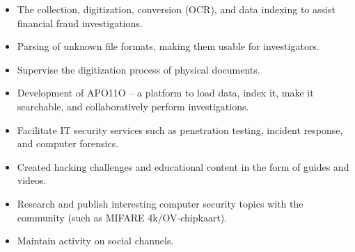 \documentclass[10pt,a4paper,ragged2e,withhyper]{altacv}
\begin{document}
\begin{paracol}{2}
\newpage

\begin{itemize}
\item The collection, digitization, conversion (OCR), and data indexing to assist financial fraud investigations.
\item Parsing of unknown file formats, making them usable for investigators.
\item Supervise the digitization process of physical documents.
\end{itemize}

\divider

\begin{itemize}
\item Development of APO11O -- a platform to load data, index it, make it searchable, and collaboratively perform investigations.
\item Facilitate IT security services such as penetration testing, incident response, and computer forensics.
\end{itemize}

\divider

\begin{itemize}
\item Created hacking challenges and educational content in the form of guides and videos.
\item Research and publish interesting computer security topics with the community (such as MIFARE 4k/OV-chipkaart).
\item Maintain activity on social channels.
\end{itemize}

\newpage

\switchcolumn


\\
\\

\divider\smallskip


 \smallskip
{} \smallskip
{} \smallskip
{} \smallskip
{} \smallskip
{} \smallskip
{} \smallskip
{} \smallskip
{} \smallskip
{} \smallskip
{}


\end{paracol}
\end{document}
